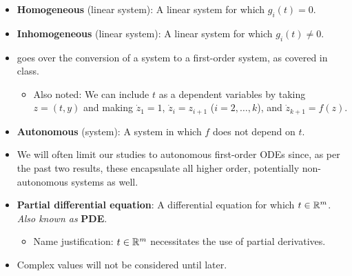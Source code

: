 \documentclass[../notes.tex]{subfiles}
\begin{document}
\begin{itemize}
\begin{itemize}
    \end{itemize}
    \item \textbf{Homogeneous} (linear system): A linear system for which $g_i(t)=0$.
    \item \textbf{Inhomogeneous} (linear system): A linear system for which $g_i(t)\neq 0$.
    \item \textcite{bib:Teschl} goes over the conversion of a system to a first-order system, as covered in class.
    \begin{itemize}
        \item Also noted: We can include $t$ as a dependent variables by taking $z=(t,y)$ and making $\dot{z}_1=1$, $\dot{z}_i=z_{i+1}$ ($i=2,\dots,k$), and $\dot{z}_{k+1}=f(z)$.
    \end{itemize}
    \item \textbf{Autonomous} (system): A system in which $f$ does not depend on $t$.
    \item We will often limit our studies to autonomous first-order ODEs since, as per the past two results, these encapsulate all higher order, potentially non-autonomous systems as well.
    \item \textbf{Partial differential equation}: A differential equation for which $t\in\mathbb{R}^m$. \emph{Also known as} \textbf{PDE}.
    \begin{itemize}
        \item Name justification: $t\in\mathbb{R}^m$ necessitates the use of partial derivatives.
    \end{itemize}
    \item Complex values will not be considered until later.
\end{itemize}
\end{document}
